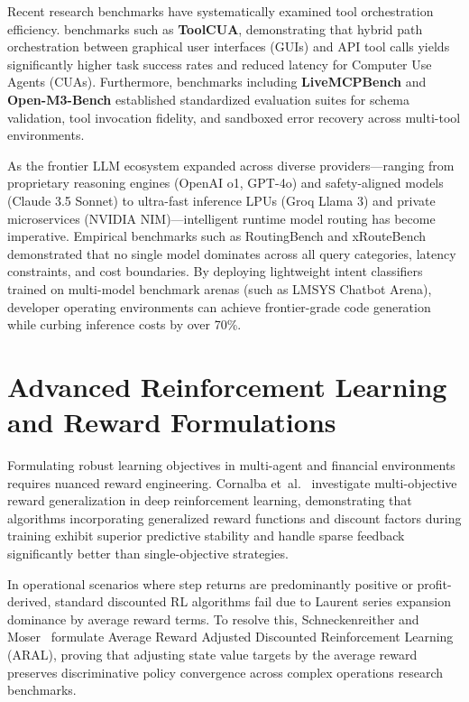 \documentclass[12pt,a4paper]{report}
\begin{document}
Recent research benchmarks have systematically examined tool orchestration efficiency. benchmarks such as \textbf{ToolCUA}, demonstrating that hybrid path orchestration between graphical user interfaces (GUIs) and API tool calls yields significantly higher task success rates and reduced latency for Computer Use Agents (CUAs). Furthermore, benchmarks including \textbf{LiveMCPBench} and \textbf{Open-M3-Bench} established standardized evaluation suites for schema validation, tool invocation fidelity, and sandboxed error recovery across multi-tool environments.

As the frontier LLM ecosystem expanded across diverse providers---ranging from proprietary reasoning engines (OpenAI o1, GPT-4o) and safety-aligned models (Claude 3.5 Sonnet) to ultra-fast inference LPUs (Groq Llama 3) and private microservices (NVIDIA NIM)---intelligent runtime model routing has become imperative. Empirical benchmarks such as RoutingBench and xRouteBench demonstrated that no single model dominates across all query categories, latency constraints, and cost boundaries. By deploying lightweight intent classifiers trained on multi-model benchmark arenas (such as LMSYS Chatbot Arena), developer operating environments can achieve frontier-grade code generation while curbing inference costs by over 70\%.

\section{Advanced Reinforcement Learning and Reward Formulations}
Formulating robust learning objectives in multi-agent and financial environments requires nuanced reward engineering. Cornalba et~al.~\cite{ref_cornalba2024_multiobj} investigate multi-objective reward generalization in deep reinforcement learning, demonstrating that algorithms incorporating generalized reward functions and discount factors during training exhibit superior predictive stability and handle sparse feedback significantly better than single-objective strategies.

In operational scenarios where step returns are predominantly positive or profit-derived, standard discounted RL algorithms fail due to Laurent series expansion dominance by average reward terms. To resolve this, Schneckenreither and Moser~\cite{ref_schneckenreither2025_aral} formulate Average Reward Adjusted Discounted Reinforcement Learning (ARAL), proving that adjusting state value targets by the average reward preserves discriminative policy convergence across complex operations research benchmarks.
\end{document}
